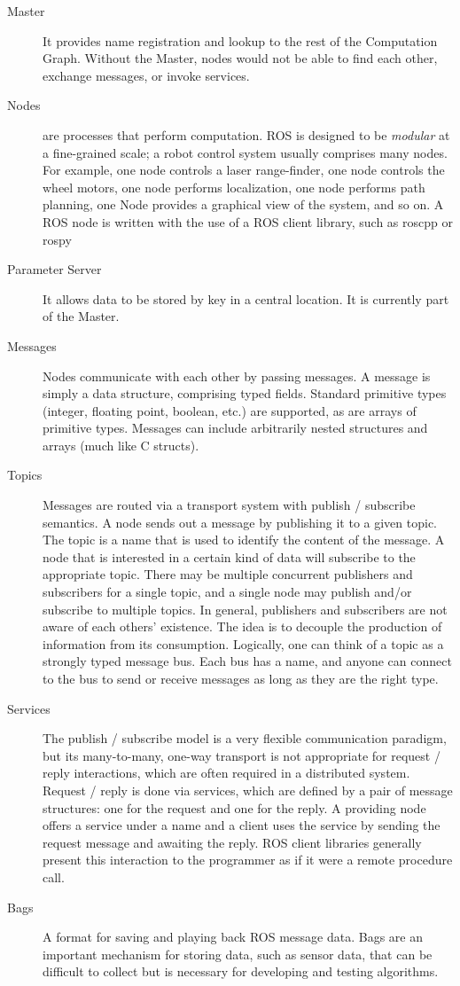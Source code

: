 \begin{description}
    \item[Master] It provides name registration and lookup to the rest of the Computation Graph. Without the Master, nodes would not be able to find each other, exchange messages, or invoke services.
    \item[Nodes] are processes that perform computation. ROS is designed to be \textit{modular} at a fine-grained scale; a robot control system usually comprises many nodes. For example, one node controls a laser range-finder, one node controls the wheel motors, one node performs localization, one node performs path planning, one Node provides a graphical view of the system, and so on. A ROS node is written with the use of a ROS client library, such as roscpp or rospy
    \item[Parameter Server] It allows data to be stored by key in a central location. It is currently part of the Master.
    \item[Messages] Nodes communicate with each other by passing messages. A message is simply a data structure, comprising typed fields. Standard primitive types (integer, floating point, boolean, etc.) are supported, as are arrays of primitive types. Messages can include arbitrarily nested structures and arrays (much like C structs).
    \item[Topics] Messages are routed via a transport system with publish / subscribe semantics. A node sends out a message by publishing it to a given topic. The topic is a name that is used to identify the content of the message. A node that is interested in a certain kind of data will subscribe to the appropriate topic. There may be multiple concurrent publishers and subscribers for a single topic, and a single node may publish and/or subscribe to multiple topics. In general, publishers and subscribers are not aware of each others’ existence. The idea is to decouple the production of information from its consumption. Logically, one can think of a topic as a strongly typed message bus. Each bus has a name, and anyone can connect to the bus to send or receive messages as long as they are the right type.
    \item[Services] The publish / subscribe model is a very flexible communication paradigm, but its many-to-many, one-way transport is not appropriate for request / reply interactions, which are often required in a distributed system. Request / reply is done via services, which are defined by a pair of message structures: one for the request and one for the reply. A providing node offers a service under a name and a client uses the service by sending the request message and awaiting the reply. ROS client libraries generally present this interaction to the programmer as if it were a remote procedure call.
    \item[Bags]A format for saving and playing back ROS message data. Bags are an important mechanism for storing data, such as sensor data, that can be difficult to collect but is necessary for developing and testing algorithms.
\end{description}
